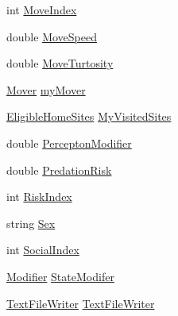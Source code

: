 \begin{DoxyCompactItemize}
\item 
int \hyperlink{class_s_e_a_r_c_h_1_1_animal_a331d43e7832be4c6bd92fac234c9d95d}{Move\-Index}
\item 
double \hyperlink{class_s_e_a_r_c_h_1_1_animal_af81e361dcacc9d6885467e0e0d7d9333}{Move\-Speed}
\item 
double \hyperlink{class_s_e_a_r_c_h_1_1_animal_ad5b3860044e5d6c935bf80f5de568595}{Move\-Turtosity}
\item 
\hyperlink{class_s_e_a_r_c_h_1_1_mover}{Mover} \hyperlink{class_s_e_a_r_c_h_1_1_animal_a490ecc2f0acee533cfed4900abaec408}{my\-Mover}
\item 
\hyperlink{class_s_e_a_r_c_h_1_1_eligible_home_sites}{Eligible\-Home\-Sites} \hyperlink{class_s_e_a_r_c_h_1_1_animal_a22a91ec4ec8cb552137231f5cc64a3d3}{My\-Visited\-Sites}
\item 
double \hyperlink{class_s_e_a_r_c_h_1_1_animal_afa65021179183373fb9af5976b06fbf8}{Percepton\-Modifier}
\item 
double \hyperlink{class_s_e_a_r_c_h_1_1_animal_a5753cc7dd073016ee6ad06a721039eda}{Predation\-Risk}
\item 
int \hyperlink{class_s_e_a_r_c_h_1_1_animal_abf5587e6141d66bfef5d0e6e5e2b0249}{Risk\-Index}
\item 
string \hyperlink{class_s_e_a_r_c_h_1_1_animal_a82057b36970fe4caf5df9f01cdec0c0b}{Sex}
\item 
int \hyperlink{class_s_e_a_r_c_h_1_1_animal_a69680225461b7a1a5b4372cc9e6100e8}{Social\-Index}
\item 
\hyperlink{class_s_e_a_r_c_h_1_1_modifier}{Modifier} \hyperlink{class_s_e_a_r_c_h_1_1_animal_acd1ded8fa372f9fce294354b95571b7e}{State\-Modifer}
\item 
\hyperlink{class_s_e_a_r_c_h_1_1_text_file_writer}{Text\-File\-Writer} \hyperlink{class_s_e_a_r_c_h_1_1_animal_a0e2be0558719e097f07a996ac36d810e}{Text\-File\-Writer}
\end{DoxyCompactItemize}


